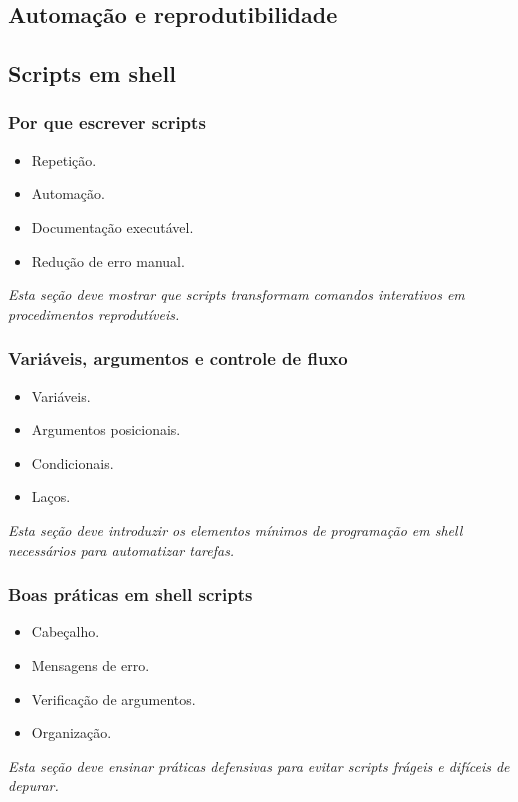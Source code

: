 \documentclass[12pt,openany]{book}
\newcommand{\placeholder}[1]{
    \par\medskip
    \noindent\textit{#1}
    \par\medskip
}
\newcommand{\topicos}[1]{
    \begin{itemize}
        #1
    \end{itemize}
}
\begin{document}
\begin{refsection}
\part{Automação e reprodutibilidade}

\chapter{Scripts em shell}

\section{Por que escrever scripts}

\topicos{
    \item Repetição.
    \item Automação.
    \item Documentação executável.
    \item Redução de erro manual.
}

\placeholder{Esta seção deve mostrar que scripts transformam comandos interativos em procedimentos reprodutíveis.}

\section{Variáveis, argumentos e controle de fluxo}

\topicos{
    \item Variáveis.
    \item Argumentos posicionais.
    \item Condicionais.
    \item Laços.
}

\placeholder{Esta seção deve introduzir os elementos mínimos de programação em shell necessários para automatizar tarefas.}

\section{Boas práticas em shell scripts}

\topicos{
    \item Cabeçalho.
    \item Mensagens de erro.
    \item Verificação de argumentos.
    \item Organização.
}

\placeholder{Esta seção deve ensinar práticas defensivas para evitar scripts frágeis e difíceis de depurar.}


\end{refsection}
\end{document}
